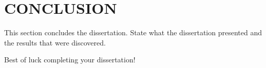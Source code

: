 \documentclass[main.tex]{subfiles}
\begin{document}
\section{CONCLUSION}

    This section concludes the dissertation.  State what the dissertation
    presented and the results that were discovered.  
    
    Best of luck completing your dissertation!
\end{document}
